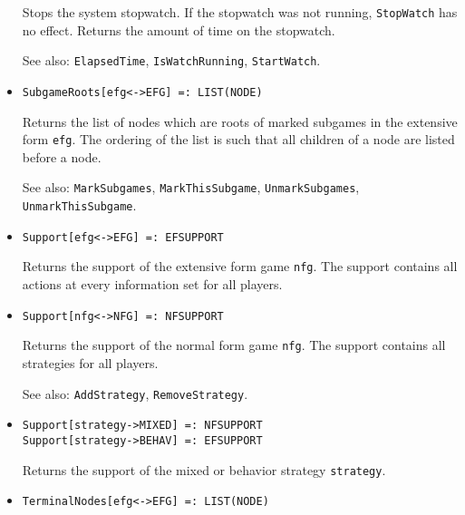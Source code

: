 \begin{itemize}
\bd
Stops the system stopwatch.  If the stopwatch was not
running, {\tt StopWatch} has no effect.  Returns the amount of time
on the stopwatch.
\item
[See also:] {\tt ElapsedTime}, {\tt IsWatchRunning}, {\tt StartWatch}.
\ed

\item
\protect \large \begin{verbatim}
SubgameRoots[efg<->EFG] =: LIST(NODE)
\end{verbatim}\normalsize

\bd Returns the list of nodes which are roots of marked subgames in
the extensive form {\tt efg}.  The ordering of the list is such that
all children of a node are listed before a node.
\item
[See also:] {\tt MarkSubgames}, {\tt MarkThisSubgame}, {\tt UnmarkSubgames},
{\tt UnmarkThisSubgame}.
\ed

\item
\protect \large \begin{verbatim}
Support[efg<->EFG] =: EFSUPPORT
\end{verbatim}\normalsize

\bd
Returns the support of the extensive form
game \verb+nfg+.  The support contains all actions at every
information set for all players.
\ed

\item
\protect \large \begin{verbatim}
Support[nfg<->NFG] =: NFSUPPORT
\end{verbatim}\normalsize

\bd
Returns the support of the normal form
game \verb+nfg+.  The support contains all strategies for all players.
\item
[See also:] {\tt AddStrategy}, {\tt RemoveStrategy}.
\ed

\item
\protect \large \begin{verbatim}
Support[strategy->MIXED] =: NFSUPPORT
Support[strategy->BEHAV] =: EFSUPPORT
\end{verbatim}\normalsize

\bd Returns the support of the mixed or behavior strategy
\verb+strategy+.  
\ed


\item
\protect \large \begin{verbatim} 
TerminalNodes[efg<->EFG] =: LIST(NODE)
\end{verbatim}\normalsize


\end{itemize}
